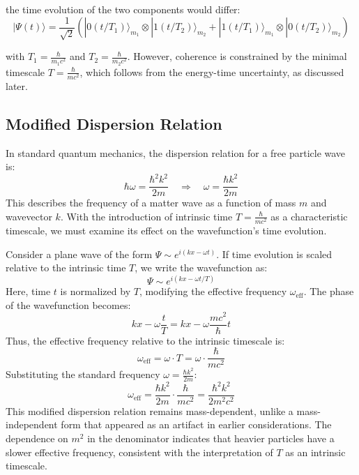 \documentclass{article}
\begin{document}
	the time evolution of the two components would differ:
	\begin{equation}
		|\Psi(t)\rangle = \frac{1}{\sqrt{2}}(|0(t/T_1)\rangle_{m_1} \otimes |1(t/T_2)\rangle_{m_2} + |1(t/T_1)\rangle_{m_1} \otimes |0(t/T_2)\rangle_{m_2})
	\end{equation}
	
	with $T_1 = \frac{\hbar}{m_1 c^2}$ and $T_2 = \frac{\hbar}{m_2 c^2}$. However, coherence is constrained by the minimal timescale $T = \frac{\hbar}{mc^2}$, which follows from the energy-time uncertainty, as discussed later.
	
	\subsection{Modified Dispersion Relation}
	
	In standard quantum mechanics, the dispersion relation for a free particle wave is:
	\begin{equation}
		\hbar \omega = \frac{\hbar^2 k^2}{2m} \quad \Rightarrow \quad \omega = \frac{\hbar k^2}{2m}
	\end{equation}
	This describes the frequency of a matter wave as a function of mass $m$ and wavevector $k$. With the introduction of intrinsic time $T = \frac{\hbar}{mc^2}$ as a characteristic timescale, we must examine its effect on the wavefunction’s time evolution.
	
	Consider a plane wave of the form $\Psi \sim e^{i(kx - \omega t)}$. If time evolution is scaled relative to the intrinsic time $T$, we write the wavefunction as:
	\begin{equation}
		\Psi \sim e^{i(kx - \omega t / T)}
	\end{equation}
	Here, time $t$ is normalized by $T$, modifying the effective frequency $\omega_{\text{eff}}$. The phase of the wavefunction becomes:
	\begin{equation}
		kx - \omega \frac{t}{T} = kx - \omega \frac{mc^2}{\hbar} t
	\end{equation}
	Thus, the effective frequency relative to the intrinsic timescale is:
	\begin{equation}
		\omega_{\text{eff}} = \omega \cdot T = \omega \cdot \frac{\hbar}{mc^2}
	\end{equation}
	Substituting the standard frequency $\omega = \frac{\hbar k^2}{2m}$:
	\begin{equation}
		\omega_{\text{eff}} = \frac{\hbar k^2}{2m} \cdot \frac{\hbar}{mc^2} = \frac{\hbar^2 k^2}{2 m^2 c^2}
	\end{equation}
	This modified dispersion relation remains mass-dependent, unlike a mass-independent form that appeared as an artifact in earlier considerations. The dependence on $m^2$ in the denominator indicates that heavier particles have a slower effective frequency, consistent with the interpretation of $T$ as an intrinsic timescale.
	
\end{document}
